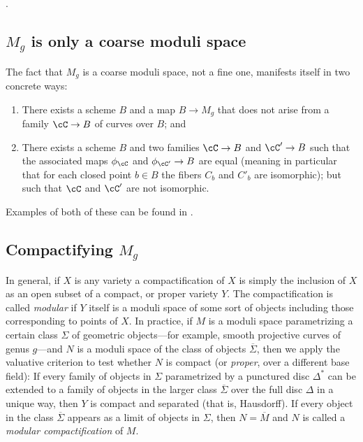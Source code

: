 .

\subsection{$M_g$ is only a coarse moduli space}

The fact that $M_g$ is a coarse moduli space, not a fine one, manifests itself in two concrete ways:

\begin{enumerate}
\item There exists a scheme $B$ and a map $B \to M_g$ that does not arise from a family $\cC \to B$ of curves over $B$; and
\item There exists a scheme $B$ and two families $\cC \to B$ and $\cC' \to B$ such that the associated maps $\phi_\cC$ and $\phi_{\cC'} \to B$ are equal (meaning in particular that for each closed point $b \in B$ the fibers $C_b$ and $C'_b$ are isomorphic); but such that $\cC$ and $\cC'$ are not isomorphic.
\end{enumerate}

Examples of both of these can be found in \cite[****]{GeomSchemes}.

\subsection{Compactifying $M_g$}\label{compactifying Mg}

In general, if $X$ is any variety a compactification of $X$ is simply the inclusion of $X$ as an open subset of a compact, or proper variety $Y$. The compactification is called \emph{modular} if $Y$ itself is a moduli space of some sort of objects including those corresponding to points of $X$. In practice, if $M$ is a moduli space parametrizing a certain class $\Sigma$ of geometric objects---for example, smooth projective curves of genus $g$---and $N$ is a moduli space of the class of objects $\overline \Sigma$, then we apply the valuative criterion to test whether $N$ is compact (or \emph{proper}, over a different base field): If every family of objects in $\Sigma$ parametrized by a punctured disc $\Delta^*$ can be extended to a family of objects in the larger class $\overline \Sigma$ over the full disc $\Delta$ in a unique way, then $Y$ is compact and separated (that is, Hausdorff). If every object in the class $\overline \Sigma$ appears as a limit of objects in $\Sigma$, then $N = \overline M$ and $N$ is called a \emph{modular compactification} of $M$.

